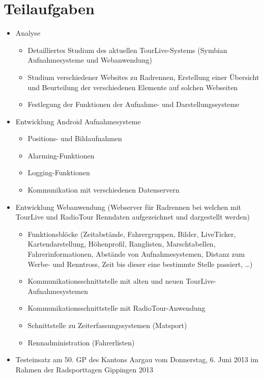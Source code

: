\section{Teilaufgaben}
\begin{itemize}
	\item Analyse
	\begin{itemize}
		\item Detailliertes Studium des aktuellen TourLive-Systems (Symbian Aufnahmesysteme und Webanwendung)
		\item Studium verschiedener Websites zu Radrennen, Erstellung einer Übersicht und Beurteilung der verschiedenen Elemente auf solchen Webseiten
		\item Festlegung der Funktionen der Aufnahme- und Darstellungssysteme
	\end{itemize}
	\item Entwicklung Android Aufnahmesysteme
	\begin{itemize}
		\item Positions- und Bildaufnahmen
		\item Alarming-Funktionen
		\item Logging-Funktionen
		\item Kommunikation mit verschiedenen Datenservern
	\end{itemize}
	\item Entwicklung Webanwendung (Webserver für Radrennen bei welchen mit TourLive und RadioTour Renndaten aufgezeichnet und dargestellt werden)
	\begin{itemize}
		\item Funktionsblöcke (Zeitabstände, Fahrergruppen, Bilder, LiveTicker, Kartendarstellung, Höhenprofil, Ranglisten, Marschtabellen, Fahrerinformationen, Abstände von Aufnahmesystemen, Distanz zum Werbe- und Renntross, Zeit bis dieser eine bestimmte Stelle passiert, …)
		\item Kommunikationsschnittstelle mit alten und neuen TourLive-Aufnahmesystemen
		\item Kommunikationsschnittstelle mit RadioTour-Anwendung
		\item Schnittstelle zu Zeiterfassungssystemen (Matsport)
		\item Rennadministration (Fahrerlisten)
	\end{itemize}
	\item Testeinsatz am 50. GP des Kantons Aargau vom Donnerstag, 6. Juni 2013 im Rahmen der Radsporttagen Gippingen 2013
\end{itemize}
